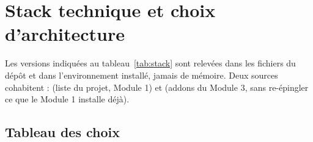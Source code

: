 \section{Stack technique et choix d'architecture}
\label{sec:stack}

Les versions indiquées au tableau~\ref{tab:stack} sont relevées dans les
fichiers du dépôt et dans l'environnement installé, jamais de mémoire.
Deux sources cohabitent :
 (liste du projet, Module 1) et
 (addons du Module 3,
sans re-épingler ce que le Module 1 installe déjà).

\subsection{Tableau des choix}

